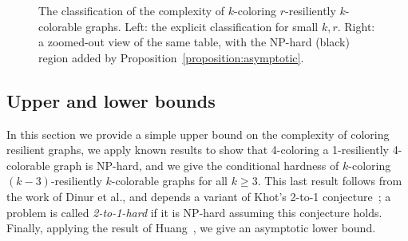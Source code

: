 \begin{figure}
\centering
\begin{subfigure}{.65\textwidth}
  \centering
\end{subfigure}%
\begin{subfigure}{.35\textwidth}
  \centering
\end{subfigure}
\caption{The  classification of the complexity of $k$-coloring
$r$-resiliently $k$-colorable graphs. Left: the explicit classification for
small $k, r$. Right: a zoomed-out view of the same table, with the 
NP-hard (black) region added by Proposition~\ref{proposition:asymptotic}.}
\label{fig:classification} \end{figure}

\subsection{Upper and lower bounds} \label{sec:easy-bounds}
In this section we provide a simple upper bound on the complexity of coloring
resilient graphs, we apply known results to show that 4-coloring a
1-resiliently 4-colorable graph is NP-hard, and we give the conditional
hardness of $k$-coloring $(k-3)$-resiliently $k$-colorable graphs for all $k
\geq 3$.  This last result follows from the work of Dinur et al., and depends a
variant of Khot's 2-to-1 conjecture~\cite{DMR06}; a problem is called
\emph{2-to-1-hard} if it is NP-hard assuming this conjecture holds. Finally,
applying the result of Huang~\cite{Huang13}, we give an asymptotic lower bound. 

